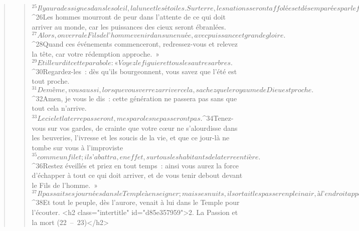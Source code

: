 \begin{verse}
\begin{verse}
${}^{25}Il y aura des signes dans le soleil, la lune et les étoiles. Sur terre, les nations seront affolées et désemparées par le fracas de la mer et des flots. 
${}^{26}Les hommes mourront de peur dans l’attente de ce qui doit arriver au monde, car les puissances des cieux seront ébranlées. 
${}^{27}Alors, on verra le Fils de l’homme venir dans une nuée, avec puissance et grande gloire. 
${}^{28}Quand ces événements commenceront, redressez-vous et relevez la tête, car votre rédemption approche. »
${}^{29}Et il leur dit cette parabole : « Voyez le figuier et tous les autres arbres. 
${}^{30}Regardez-les : dès qu’ils bourgeonnent, vous savez que l’été est tout proche. 
${}^{31}De même, vous aussi, lorsque vous verrez arriver cela, sachez que le royaume de Dieu est proche. 
${}^{32}Amen, je vous le dis : cette génération ne passera pas sans que tout cela n’arrive. 
${}^{33}Le ciel et la terre passeront, mes paroles ne passeront pas.
${}^{34}Tenez-vous sur vos gardes, de crainte que votre cœur ne s’alourdisse dans les beuveries, l’ivresse et les soucis de la vie, et que ce jour-là ne tombe sur vous à l’improviste 
${}^{35}comme un filet ; il s’abattra, en effet, sur tous les habitants de la terre entière. 
${}^{36}Restez éveillés et priez en tout temps : ainsi vous aurez la force d’échapper à tout ce qui doit arriver, et de vous tenir debout devant le Fils de l’homme. »
${}^{37}Il passait ses journées dans le Temple à enseigner ; mais ses nuits, il sortait les passer en plein air, à l’endroit appelé mont des Oliviers.
${}^{38}Et tout le peuple, dès l’aurore, venait à lui dans le Temple pour l’écouter.
      <h2 class="intertitle" id="d85e357959">2. La Passion et la mort (22 – 23)</h2>
      

\end{verse}
\end{verse}
